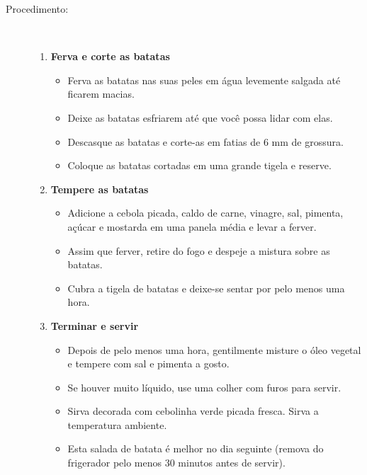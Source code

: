 \documentclass [11pt, letterpaper] {article}
\begin{document}
\begin {description}
\item [Procedimento:] \ \\
\begin {enumerate}
\item {\bf Ferva e corte as batatas}
\begin {itemize}
\item Ferva as batatas nas suas peles em água levemente salgada até ficarem macias.
\item Deixe as batatas esfriarem até que você possa lidar com elas.
\item Descasque as batatas e corte-as em fatias de 6 mm de grossura.
\item Coloque as batatas cortadas em uma grande tigela e reserve.
\end {itemize}
\item {\bf Tempere as batatas}
\begin {itemize}
\item Adicione a cebola picada, caldo de carne, vinagre, sal, pimenta, açúcar e mostarda em uma panela média e levar a ferver.
\item Assim que ferver, retire do fogo e despeje a mistura sobre as batatas.
\item Cubra a tigela de batatas e deixe-se sentar por pelo menos uma hora.
\end {itemize}
\item {\bf Terminar e servir}
\begin {itemize}
\item Depois de pelo menos uma hora, gentilmente misture o óleo vegetal e tempere com sal e pimenta a gosto.
\item Se houver muito líquido, use uma colher com furos para servir.
\item Sirva decorada com cebolinha verde picada fresca. Sirva a temperatura ambiente.
\item Esta salada de batata é melhor no dia seguinte (remova do frigerador pelo menos 30 minutos antes de servir).
\end {itemize}
\end{enumerate}
\end {description}
\end{document}
